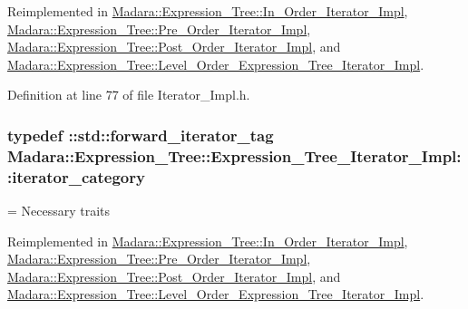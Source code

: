 Reimplemented in \hyperlink{classMadara_1_1Expression__Tree_1_1In__Order__Iterator__Impl_a1bf230e1039e07e863f68425a4e53238}{Madara::Expression\_\-Tree::In\_\-Order\_\-Iterator\_\-Impl}, \hyperlink{classMadara_1_1Expression__Tree_1_1Pre__Order__Iterator__Impl_a4c64f0f28e72f46c878f5bae77a83f9a}{Madara::Expression\_\-Tree::Pre\_\-Order\_\-Iterator\_\-Impl}, \hyperlink{classMadara_1_1Expression__Tree_1_1Post__Order__Iterator__Impl_a126fb29e61a2f9753ca68acb648372e6}{Madara::Expression\_\-Tree::Post\_\-Order\_\-Iterator\_\-Impl}, and \hyperlink{classMadara_1_1Expression__Tree_1_1Level__Order__Expression__Tree__Iterator__Impl_a7400a3a22e09dbb8ba5064bb902e5879}{Madara::Expression\_\-Tree::Level\_\-Order\_\-Expression\_\-Tree\_\-Iterator\_\-Impl}.



Definition at line 77 of file Iterator\_\-Impl.h.

\hypertarget{classMadara_1_1Expression__Tree_1_1Expression__Tree__Iterator__Impl_a59d9cb2efd705e21684d901de09399c7}{
\subsubsection[{iterator\_\-category}]{\setlength{\rightskip}{0pt plus 5cm}typedef ::std::forward\_\-iterator\_\-tag {\bf Madara::Expression\_\-Tree::Expression\_\-Tree\_\-Iterator\_\-Impl::iterator\_\-category}}}
\label{d0/dd7/classMadara_1_1Expression__Tree_1_1Expression__Tree__Iterator__Impl_a59d9cb2efd705e21684d901de09399c7}


= Necessary traits 



Reimplemented in \hyperlink{classMadara_1_1Expression__Tree_1_1In__Order__Iterator__Impl_a5f8929d840ab9350d02d69316eead171}{Madara::Expression\_\-Tree::In\_\-Order\_\-Iterator\_\-Impl}, \hyperlink{classMadara_1_1Expression__Tree_1_1Pre__Order__Iterator__Impl_a652d035072052fa7aacf532038ada5ea}{Madara::Expression\_\-Tree::Pre\_\-Order\_\-Iterator\_\-Impl}, \hyperlink{classMadara_1_1Expression__Tree_1_1Post__Order__Iterator__Impl_a7705e7513403a9230549f22307fc48a1}{Madara::Expression\_\-Tree::Post\_\-Order\_\-Iterator\_\-Impl}, and \hyperlink{classMadara_1_1Expression__Tree_1_1Level__Order__Expression__Tree__Iterator__Impl_a0ba7cef7284272a0231bb5b8a6f1dcef}{Madara::Expression\_\-Tree::Level\_\-Order\_\-Expression\_\-Tree\_\-Iterator\_\-Impl}.



